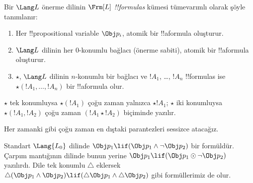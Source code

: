 \documentclass[../../../include/open-logic-section]{subfiles}
\begin{document}


\begin{defn}[Formül]
Bir $\Lang L$ önerme dilinin $\Frm[L]$ \emph{!!{formula}s} kümesi
tümevarımlı olarak şöyle tanımlanır:
\begin{enumerate}
\item Her !!{propositional variable} $\Obj p_i$, atomik bir !!a{formula}
  oluşturur.
\item $\Lang L$ dilinin her $0$-konumlu bağlacı (önerme sabiti), atomik
  bir !!a{formula} oluşturur.
\item $\star$, $\Lang L$ dilinin $n$-konumlu bir bağlacı ve $!A_1$,
\dots, $!A_n$ !!{formula}s ise $\star(!A_1,\dots,!A_n)$ bir
!!a{formula} olur.
\end{enumerate}
$\star$ tek konumluysa $\star(!A_1)$ çoğu zaman yalnızca $\star !A_1$;
$\star$ iki konumluysa $\star(!A_1,!A_2)$ çoğu zaman
$(!A_1\star !A_2)$ biçiminde yazılır.
\end{defn}

Her zamanki gibi çoğu zaman en dıştaki parantezleri sessizce atacağız.

\begin{ex}
Standart $\Lang{L_0}$ dilinde
$\Obj p_1 \lif (\Obj p_1 \land \lnot \Obj p_2)$ bir formüldür. Çarpım
mantığının dilinde bunun yerine
$\Obj p_1 \lif (\Obj p_1 \odot \lnot \Obj p_2)$ yazılırdı. Dile tek
konumlu $\triangle$ eklersek
$\triangle (\Obj p_1 \land \Obj p_2) \lif
(\triangle \Obj p_1 \land \triangle \Obj p_2)$ gibi formüllerimiz de olur.
\end{ex}
\end{document}
